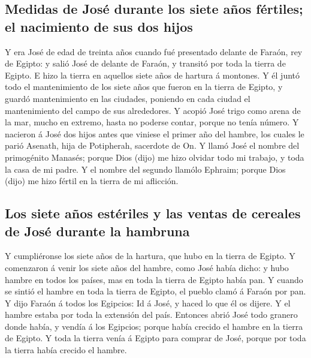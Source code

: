 \hypertarget{medidas-de-josuxe9-durante-los-siete-auxf1os-fuxe9rtiles-el-nacimiento-de-sus-dos-hijos}{%
\subsection{Medidas de José durante los siete años fértiles; el
nacimiento de sus dos
hijos}\label{medidas-de-josuxe9-durante-los-siete-auxf1os-fuxe9rtiles-el-nacimiento-de-sus-dos-hijos}}

 Y era José de edad de treinta años cuando fué presentado
delante de Faraón, rey de Egipto: y salió José de delante de Faraón, y
transitó por toda la tierra de Egipto.  E hizo la tierra en
aquellos siete años de hartura á montones.  Y él juntó todo
el mantenimiento de los siete años que fueron en la tierra de Egipto, y
guardó mantenimiento en las ciudades, poniendo en cada ciudad el
mantenimiento del campo de sus alrededores.  Y acopió José
trigo como arena de la mar, mucho en extremo, hasta no poderse contar,
porque no tenía número.  Y nacieron á José dos hijos antes
que viniese el primer año del hambre, los cuales le parió Asenath, hija
de Potipherah, sacerdote de On.  Y llamó José el nombre del
primogénito Manasés; porque Dios (dijo) me hizo olvidar todo mi trabajo,
y toda la casa de mi padre.  Y el nombre del segundo
llamólo Ephraim; porque Dios (dijo) me hizo fértil en la tierra de mi
aflicción.

\hypertarget{los-siete-auxf1os-estuxe9riles-y-las-ventas-de-cereales-de-josuxe9-durante-la-hambruna}{%
\subsection{Los siete años estériles y las ventas de cereales de José
durante la
hambruna}\label{los-siete-auxf1os-estuxe9riles-y-las-ventas-de-cereales-de-josuxe9-durante-la-hambruna}}

 Y cumpliéronse los siete años de la hartura, que hubo en
la tierra de Egipto.  Y comenzaron á venir los siete años
del hambre, como José había dicho: y hubo hambre en todos los países,
mas en toda la tierra de Egipto había pan.  Y cuando se
sintió el hambre en toda la tierra de Egipto, el pueblo clamó á Faraón
por pan. Y dijo Faraón á todos los Egipcios: Id á José, y haced lo que
él os dijere.  Y el hambre estaba por toda la extensión del
país. Entonces abrió José todo granero donde había, y vendía á los
Egipcios; porque había crecido el hambre en la tierra de Egipto.
 Y toda la tierra venía á Egipto para comprar de José,
porque por toda la tierra había crecido el hambre.

